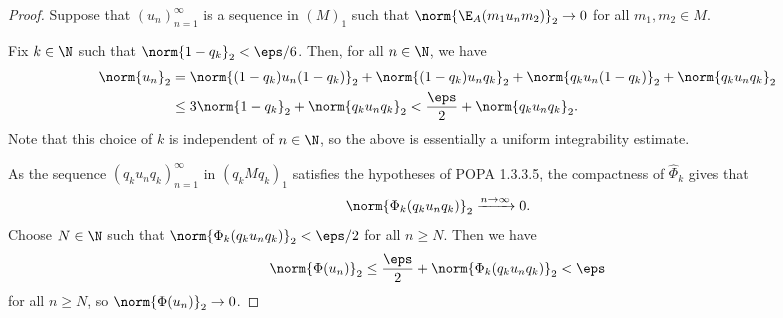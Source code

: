 \documentclass[12pt]{article}
\begin{document}
\begin{proof}
    Suppose that $ (u_{n})_{n=1}^{\infty}$ is a sequence in $ (M)_{1} $ such that $ \norm{\E_{A}(m_{1}u_{n}m_{2})}_{2}\to 0 $ for all $ m_{1},m_{2}\in M $.
    
    Fix $ k\in \N $ such that $ \norm{1-q_{k}}_{2} < \eps/6$. Then, for all $ n\in \N $, we have
    \begin{align*}
      \norm{u_{n}}_{2} &= \norm{(1-q_{k})u_{n}(1-q_{k})}_{2} + \norm{(1-q_{k})u_{n} q_{k}}_{2} + \norm{q_{k}u_{n}(1-q_{k})}_{2} + \norm{q_{k}u_{n}q_{k}}_{2}\\
      &\leq 3\norm{1-q_{k}}_{2} + \norm{q_{k}u_{n}q_{k}}_{2}  < \frac{\eps}{2} + \norm{q_{k}u_{n}q_{k}}_{2}.
    \end{align*}
    Note that this choice of $ k $ is independent of $ n \in \N$, so the above is essentially a uniform integrability estimate. 

    As the sequence $ (q_{k}u_{n}q_{k})_{n=1}^{\infty} $ in $ (q_{k}Mq_{k})_{1} $ satisfies the hypotheses of POPA 1.3.3.5, the compactness of $ \widehat{\Phi}_{k} $ gives that 
    \[
      \norm{\Phi_{k}(q_{k}u_{n}q_{k})}_{2} \xrightarrow{n\to\infty} 0.
    \]
    Choose $ N\in \N $ such that $ \norm{\Phi_{k}(q_{k}u_{n}q_{k})}_{2} < \eps/2 $ for all $ n\geq N $. Then we have 
    \begin{align*}
       \norm{\Phi(u_{n})}_{2}  \leq \frac{\eps}{2} + \norm{\Phi_{k}(q_{k}u_{n}q_{k})}_{2} < \eps
    \end{align*}
    for all $ n\geq N $, so $ \norm{\Phi(u_{n})}_{2}\to 0 $.


\end{proof}
\end{document}
